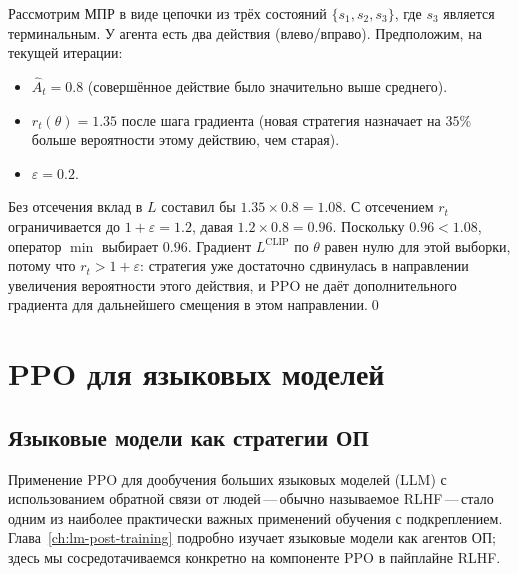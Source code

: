 \begin{example}
\label{ex:ppo-numeric}
Рассмотрим МПР в виде цепочки из трёх состояний $\{s_1, s_2, s_3\}$, где $s_3$ является терминальным. У агента есть два действия (влево/вправо). Предположим, на текущей итерации:
\begin{itemize}[leftmargin=*]
  \item $\hat{A}_t = 0.8$ (совершённое действие было значительно выше среднего).
  \item $r_t(\theta) = 1.35$ после шага градиента (новая стратегия назначает на $35\%$ больше вероятности этому действию, чем старая).
  \item $\varepsilon = 0.2$.
\end{itemize}
Без отсечения вклад в $L$ составил бы $1.35 \times 0.8 = 1.08$. С отсечением $r_t$ ограничивается до $1+\varepsilon = 1.2$, давая $1.2 \times 0.8 = 0.96$. Поскольку $0.96 < 1.08$, оператор $\min$ выбирает $0.96$. Градиент $L^{\mathrm{CLIP}}$ по $\theta$ равен нулю для этой выборки, потому что $r_t > 1+\varepsilon$: стратегия уже достаточно сдвинулась в направлении увеличения вероятности этого действия, и PPO не даёт дополнительного градиента для дальнейшего смещения в этом направлении.\qed
\end{example}

\section{PPO для языковых моделей}
\label{sec:ppo-llm}

\subsection{Языковые модели как стратегии ОП}

Применение PPO для дообучения больших языковых моделей (LLM) с использованием обратной связи от людей\,---\,обычно называемое RLHF\,---\,стало одним из наиболее практически важных применений обучения с подкреплением. Глава~\ref{ch:lm-post-training} подробно изучает языковые модели как агентов ОП; здесь мы сосредотачиваемся конкретно на компоненте PPO в пайплайне RLHF.

